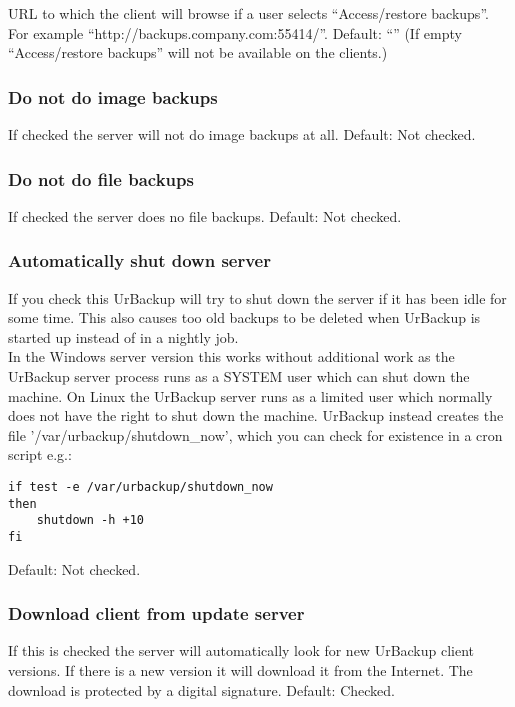\documentclass[a4paper,10pt]{article}
\begin{document}
URL to which the client will browse if a user selects ``Access/restore backups''. For example ``http://backups.company.com:55414/''. Default: ``'' (If empty ``Access/restore backups'' will not be available on the clients.)

\subsubsection{Do not do image backups}

If checked the server will not do image backups at all. Default: Not checked.

\subsubsection{Do not do file backups}

If checked the server does no file backups. Default: Not checked.

\subsubsection{Automatically shut down server}

If you check this UrBackup will try to shut down the server if it has been idle for some time. This also causes too old backups to be deleted when UrBackup is started up instead of in a nightly job.\\
In the Windows server version this works without additional work as the UrBackup
server process runs as a SYSTEM user which can shut down the machine. On Linux
the UrBackup server runs as a limited user which normally does not have the right to
shut down the machine. UrBackup instead creates the file
'/var/urbackup/shutdown\_now', which you can check for existence in a cron
script e.g.:
\begin{verbatim}
if test -e /var/urbackup/shutdown_now
then
	shutdown -h +10
fi
\end{verbatim}

Default: Not checked.

\subsubsection{Download client from update server}

If this is checked the server will automatically look for new UrBackup client
versions. If there is a new version it will download it from the Internet. The
download is protected by a digital signature. Default: Checked.
\end{document}
